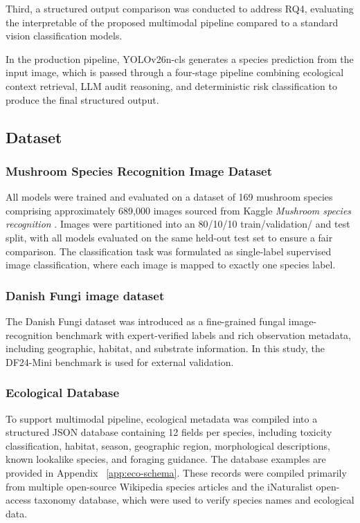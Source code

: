 \documentclass[journal,transmag]{IEEEtran}
\begin{document}
Third, a structured output comparison was conducted to address RQ4, evaluating the interpretable of the proposed multimodal pipeline compared to a standard vision classification models.

In the production pipeline, YOLOv26n-cls generates a species prediction from the input image, which is passed through a four-stage pipeline combining ecological context retrieval, LLM audit reasoning, and deterministic risk classification to produce the final structured output.

\subsection{\textbf{Dataset}}

\subsubsection{\textbf{Mushroom Species Recognition Image Dataset}}
All models were trained and evaluated on a dataset of 169 mushroom species comprising approximately 689,000 images sourced from Kaggle \textit{Mushroom species recognition} \cite{kaggle_mushroom1}. Images were partitioned into an 80/10/10 train/validation/ and test split, with all models evaluated on the same held-out test set to ensure a fair comparison. The classification task was formulated as single-label supervised image classification, where each image is mapped to exactly one species label.

\subsubsection{\textbf{Danish Fungi image dataset}}
The Danish Fungi dataset was introduced as a fine-grained fungal image-recognition benchmark with expert-verified labels and rich observation metadata, including geographic, habitat, and substrate information\cite{picek2022danishfungi}\cite{picek2025fungitastic}. In this study, the DF24-Mini benchmark is used for external validation.

\subsubsection{\textbf{Ecological Database}}\label{sec:ecological-db}
To support multimodal pipeline, ecological metadata was compiled into a structured JSON database containing 12 fields per species, including toxicity classification, habitat, season, geographic region, morphological descriptions, known lookalike species, and foraging guidance. The database examples are provided in Appendix ~\ref{app:eco-schema}. These records were compiled primarily from multiple open-source Wikipedia species articles and the iNaturalist open-access taxonomy database, which were used to verify species names and ecological data\cite{wikipedia_mushroom}\cite{inaturalist_taxa}. 
\end{document}
